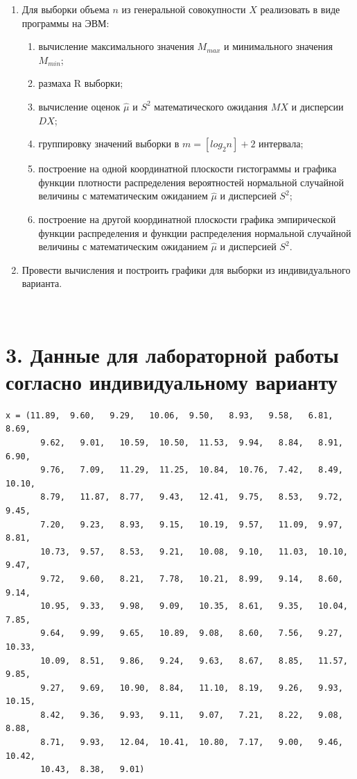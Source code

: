 \documentclass[12pt]{report}
\begin{document}
\begin{enumerate}
	\item Для выборки объема $n$ из генеральной совокупности $X$ реализовать в виде программы на ЭВМ:
		\begin{enumerate}
			\item вычисление максимального значения $M_{max}$ и минимального значения $M_{min}$;
			\item размаха R выборки;
			\item вычисление оценок $\hat\mu$ и $S^2$ математического ожидания $MX$ и дисперсии $DX$;
			\item группировку значений выборки в $m = [log_2n] + 2$ интервала;
			\item построение на одной координатной плоскости гистограммы и графика функции плотности распределения вероятностей нормальной случайной величины с математическим ожиданием $\hat\mu$ и дисперсией $S^2$;
			\item построение на другой координатной плоскости графика эмпирической функции распределения и функции распределения нормальной случайной величины с математическим ожиданием $\hat\mu$ и дисперсией $S^2$.
		\end{enumerate}
	\item Провести вычисления и построить графики для выборки из индивидуального варианта.
\end{enumerate}

~\

\section*{3. Данные для лабораторной работы согласно индивидуальному варианту}

\begin{lstlisting}[caption={Выборка для варианта №12}]
x = (11.89,  9.60,   9.29,   10.06,  9.50,   8.93,   9.58,   6.81,   8.69, 
	   9.62,   9.01,   10.59,  10.50,  11.53,  9.94,   8.84,   8.91,   6.90,
	   9.76,   7.09,   11.29,  11.25,  10.84,  10.76,  7.42,   8.49,   10.10,
	   8.79,   11.87,  8.77,   9.43,   12.41,  9.75,   8.53,   9.72,   9.45,
	   7.20,   9.23,   8.93,   9.15,   10.19,  9.57,   11.09,  9.97,   8.81,
	   10.73,  9.57,   8.53,   9.21,   10.08,  9.10,   11.03,  10.10,  9.47,
	   9.72,   9.60,   8.21,   7.78,   10.21,  8.99,   9.14,   8.60,   9.14,  
	   10.95,  9.33,   9.98,   9.09,   10.35,  8.61,   9.35,   10.04,  7.85,
	   9.64,   9.99,   9.65,   10.89,  9.08,   8.60,   7.56,   9.27,   10.33,
	   10.09,  8.51,   9.86,   9.24,   9.63,   8.67,   8.85,   11.57,  9.85,
	   9.27,   9.69,   10.90,  8.84,   11.10,  8.19,   9.26,   9.93,   10.15,  
	   8.42,   9.36,   9.93,   9.11,   9.07,   7.21,   8.22,   9.08,   8.88,   
	   8.71,   9.93,   12.04,  10.41,  10.80,  7.17,   9.00,   9.46,   10.42,  
	   10.43,  8.38,   9.01) 
\end{lstlisting}
\end{document}

